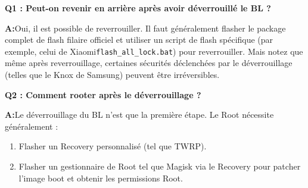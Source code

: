 
\textbf{Q1 : Peut-on revenir en arrière après avoir déverrouillé le BL ?}\par

\textbf{A:}Oui, il est possible de reverrouiller. Il faut généralement flasher le package complet de flash filaire officiel et utiliser un script de flash spécifique (par exemple, celui de Xiaomi\texttt{flash\_all\_lock.\allowbreak bat}) pour reverrouiller. Mais notez que même après reverrouillage, certaines sécurités déclenchées par le déverrouillage (telles que le Knox de Samsung) peuvent être irréversibles.

\textbf{Q2 : Comment rooter après le déverrouillage ?}\par

\textbf{A:}Le déverrouillage du BL n'est que la première étape. Le Root nécessite généralement :

\begin{enumerate}
  \item Flasher un Recovery personnalisé (tel que TWRP).
  \item Flasher un gestionnaire de Root tel que Magisk via le Recovery pour patcher l'image boot et obtenir les permissions Root.
\end{enumerate}
